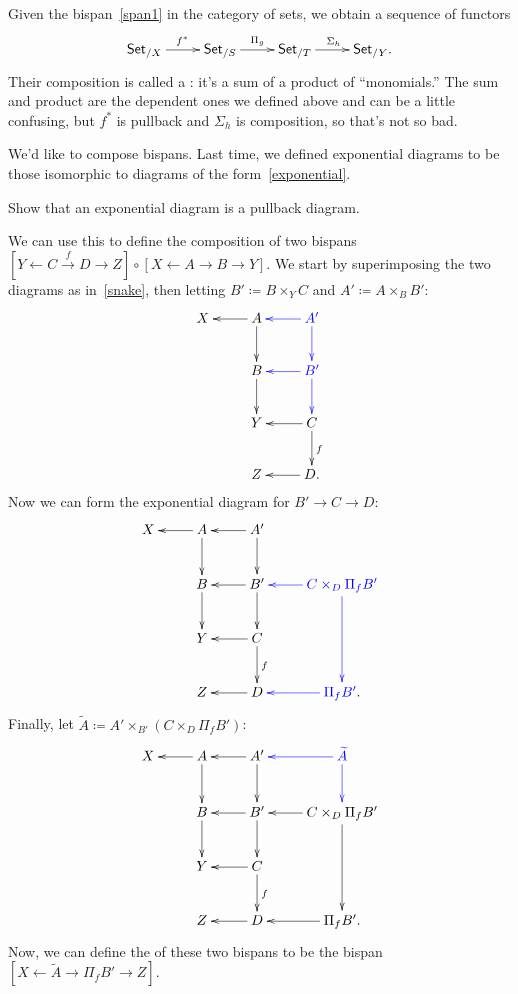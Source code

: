 Given the bispan~\eqref{span1} in the category of sets, we obtain a sequence of functors
\[\xymatrix{
	\Set_{/X}\ar[r]^{f^*} & \Set_{/S}\ar[r]^{\Pi_g} & \Set_{/T}\ar[r]^{\Sigma_h} & \Set_{/Y}.
}\]
Their composition is called a : it's a sum of a product of ``monomials.'' The sum and
product are the dependent ones we defined above and can be a little confusing, but $f^*$ is pullback and $\Sigma_h$
is composition, so that's not so bad.

We'd like to compose bispans. Last time, we defined exponential diagrams to be those isomorphic to diagrams of the
form~\eqref{exponential}.
\begin{ex}
Show that an exponential diagram is a pullback diagram.
\end{ex}
We can use this to define the composition of two bispans $[Y\gets C\stackrel f\to D\to Z]\circ[X\gets A\to B\to
Y]$. We start by superimposing the two diagrams as in~\eqref{snake}, then letting $B'\coloneqq B\times_Y C$ and
$A'\coloneqq A\times_B B'$:
\[\xymatrix{
	X & A\ar[l]\ar[d] & \textcolor{blue}{A'}\ar@[blue][l]\ar@[blue][d]\\
	& B\ar[d] & \textcolor{blue}{B'}\ar@[blue][l]\ar@[blue][d]\\
	& Y & C\ar[l]\ar[d]^f\\
	& Z & D.\ar[l]
}\]
Now we can form the exponential diagram for $B'\to C\to D$:
\[\xymatrix{
	X & A\ar[l]\ar[d] & A'\ar[l]\ar[d]\\
	& B\ar[d] & B'\ar[l]\ar[d] & \textcolor{blue}{C\times_D\Pi_fB'}\ar@[blue][l]\ar@[blue][dd]\\
	& Y & C\ar[l]\ar[d]^f\\
	& Z & D\ar[l] & \textcolor{blue}{\Pi_fB'}.\ar@[blue][l]
}\]
Finally, let $\widetilde A\coloneqq A'\times_{B'} (C\times_D\Pi_fB')$:
\[\xymatrix{
	X & A\ar[l]\ar[d] & A'\ar[l]\ar[d] & \textcolor{blue}{\widetilde A}\ar@[blue][l]\ar@[blue][d]\\
	& B\ar[d] & B'\ar[l]\ar[d] & C\times_D\Pi_fB'\ar[l]\ar[dd]\\
	& Y & C\ar[l]\ar[d]^f\\
	& Z & D\ar[l] & \Pi_fB'.\ar[l]
}\]
Now, we can define the  of these two bispans to be the bispan $[X\gets
\widetilde A\to\Pi_fB'\to Z]$.

